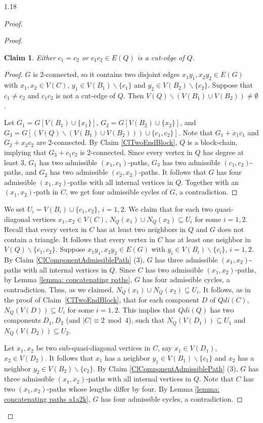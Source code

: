\documentclass[10pt]{article}
\newtheorem{subclaim}{Claim}[claim]
\begin{document}
\begin{spacing}{1.18}
\begin{proof}
\begin{proof}
    \begin{subclaim}\label{Clz1z2CutEdge}
        Either $c_1=c_2$ or $c_1c_2\in E(Q)$ is a cut-edge of $Q$.
    \end{subclaim}

    \begin{proof}
        $G$ is 2-connected, so it contains two disjoint edges $x_1y_1,x_2y_2\in E(G)$ with $x_1,x_2\in V(C)$, $y_1\in V(B_1)\backslash\{c_1\}$ and $y_2\in V(B_2)\backslash\{c_2\}$. Suppose that $c_1\neq c_2$ and $c_1c_2$ is not a cut-edge of $Q$. Then $V(Q)\backslash(V(B_1)\cup V(B_2))\neq\emptyset$.       
        
        Let $G_1=G[V(B_1)\cup\{x_1\}]$, $G_2=G[V(B_2)\cup\{x_2\}]$, and $G_3=G[(V(Q)\backslash(V(B_1)\cup V(B_2)))\cup\{c_1,c_2\}]$. Note that $G_1+x_1c_1$ and $G_2+x_2c_2$ are 2-connected. By Claim \ref{ClTwoEndBlock}, $Q$ is a block-chain, implying that $G_3+c_1c_2$ is 2-connected. Since every vertex in $Q$ has degree at least 3, $G_1$ has two admissible $(x_1,c_1)$-paths, $G_3$ has two admissible $(c_1,c_2)$-paths, and $G_2$ has two admissible $(c_2,x_2)$-paths. It follows that $G$ has four admissible $(x_1,x_2)$-paths with all internal vertices in $Q$. Together with an $(x_1,x_2)$-path in $C$, we get four admissible cycles of $G$, a contradiction.
    \end{proof}

    We set $U_i=V(B_i)\cup\{c_1,c_2\}$, $i=1,2$. We claim that for each two quasi-diagonal vertices $x_1,x_2\in V(C)$, $N_Q(x_1)\cup N_Q(x_2)\subseteq U_i$ for some $i=1,2$. Recall that every vertex in $C$ has at least two neighbors in $Q$ and $G$ does not contain a triangle. It follows that every vertex in $C$ has at least one neighbor in $V(Q)\backslash\{c_1,c_2\}$. Suppose $x_1y_1,x_2y_2\in E(G)$ with $y_i\in V(B_i)\backslash\{c_i\}$, $i=1,2$. By Claim \ref{ClComponentAdmissiblePath} (3), $G$ has three admissible $(x_1,x_2)$-paths with all internal vertices in $Q$. Since $C$ has two admissible $(x_1,x_2)$-paths, by Lemma \ref{lemma: concatenating paths}, $G$ has four admissible cycles, a contradiction. Thus, as we claimed, $N_Q(x_1)\cup N_Q(x_2)\subseteq U_i$. It follows, as in the proof of Claim~\ref{ClTwoEndBlock}, that for each component $D$ of $Qdi(C)$, $N_Q(V(D))\subseteq U_i$ for some $i=1,2$. This implies that $Qdi(Q)$ has two components $D_1,D_2$ (and $|C|\equiv 2\bmod 4$), such that $N_Q(V(D_1))\subseteq U_1$ and $N_Q(V(D_2))\subseteq U_2$.

    Let $x_1,x_2$ be two sub-quasi-diagonal vertices in $C$, say $x_1\in V(D_1)$, $x_2\in V(D_2)$. It follows that $x_1$ has a neighbor $y_1\in V(B_1)\backslash\{c_1\}$ and $x_2$ has a neighbor $y_2\in V(B_2)\backslash\{c_2\}$. By Claim \ref{ClComponentAdmissiblePath} (3), $G$ has three admissible $(x_1,x_2)$-paths with all internal vertices in $Q$. Note that $C$ has two $(x_1,x_2)$-paths whose lengths differ by four. By Lemma \ref{lemma: concatenating paths a1a2k}, $G$ has four admissible cycles, a contradiction.
\end{proof}


\end{proof}
\end{spacing}
\end{document}

